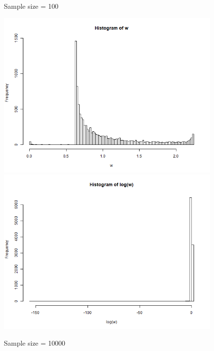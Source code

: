 \documentclass{article}
\begin{document}
{\begin{figure}[H]
        \caption{Sample size = 100}
    \end{figure}
    \begin{figure}[H]
        \centering
        \includegraphics[width = 0.6\linewidth]{1_weight_10000.png}
        \includegraphics[width = 0.6\linewidth]{1_log_weight_10000.png}
        \caption{Sample size = 10000}
    \end{figure}

}
\end{document}
